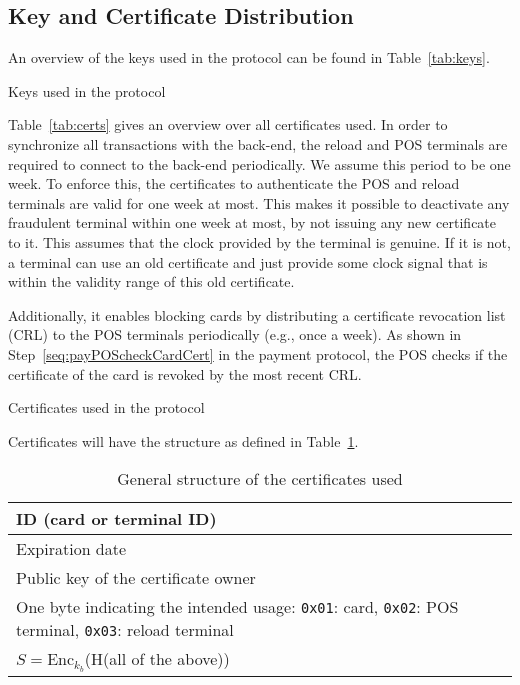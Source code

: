 \subsection{Key and Certificate Distribution}

An overview of the keys used in the protocol can be found in Table~\ref{tab:keys}.
\begin{table}[h]
    \centering
    
    \caption{Keys used in the protocol}
    \label{tab:keys}
\end{table}

Table~\ref{tab:certs} gives an overview over all certificates used.
In order to synchronize all transactions with the back-end, the reload and POS terminals are required to connect to the back-end periodically.
We assume this period to be one week.
To enforce this, the certificates to authenticate the POS and reload terminals are valid for one week at most.
This makes it possible to deactivate any fraudulent terminal within one week at most, by not issuing any new certificate to it.
This assumes that the clock provided by the terminal is genuine.
If it is not, a terminal can use an old certificate and just provide some clock signal that is within the validity range of this old certificate.

Additionally, it enables blocking cards by distributing a certificate revocation list (CRL) to the POS terminals periodically (e.g., once a week).
As shown in Step~\ref{seq:payPOScheckCardCert} in the payment protocol, the POS checks if the certificate of the card is revoked by the most recent CRL\@.

\begin{table}[h!]
    \centering
    
    \caption{Certificates used in the protocol}
    \label{tab:certs}
\end{table}

Certificates will have the structure as defined in Table~\ref{tab:certStructure}.
\begin{table}[h!]
    \centering
    \begin{tabular}{|p{8cm}|}
    \hline
        ID (card or terminal ID) \\
    \hline
        Expiration date \\
    \hline
        Public key of the certificate owner \\
    \hline
        One byte indicating the intended usage: \texttt{0x01}: card, \texttt{0x02}: POS terminal, \texttt{0x03}: reload terminal \\
    \hline
        $S = \textrm{Enc}_{k_b}$(H(all of the above)) \\
    \hline
    \end{tabular}
    \caption{General structure of the certificates used}
    \label{tab:certStructure}
\end{table}

